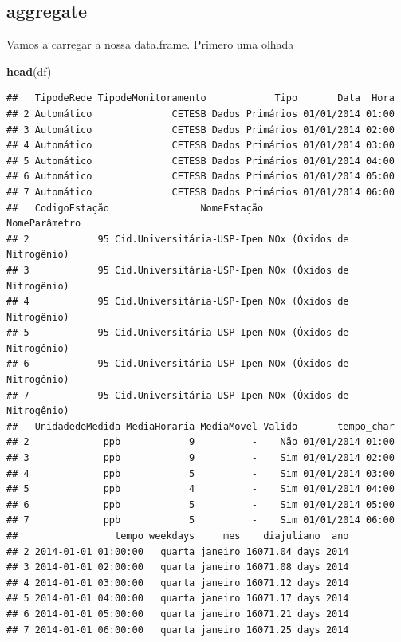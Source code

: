 \documentclass[]{book}
\newenvironment{Shaded}{\begin{snugshade}}{\end{snugshade}}
\newcommand{\KeywordTok}[1]{\textcolor[rgb]{0.13,0.29,0.53}{\textbf{#1}}}
\newcommand{\StringTok}[1]{\textcolor[rgb]{0.31,0.60,0.02}{#1}}
\newcommand{\OperatorTok}[1]{\textcolor[rgb]{0.81,0.36,0.00}{\textbf{#1}}}
\newcommand{\NormalTok}[1]{#1}
\theoremstyle{definition}
\theoremstyle{definition}
\theoremstyle{definition}
\theoremstyle{remark}
\begin{document}
\begin{Shaded}
\end{Shaded}

\subsection{aggregate}\label{aggregate}

Vamos a carregar a nossa data.frame. Primero uma olhada

\begin{Shaded}
\begin{Highlighting}[]
\KeywordTok{head}\NormalTok{(df)}
\end{Highlighting}
\end{Shaded}

\begin{verbatim}
##   TipodeRede TipodeMonitoramento            Tipo       Data  Hora
## 2 Automático              CETESB Dados Primários 01/01/2014 01:00
## 3 Automático              CETESB Dados Primários 01/01/2014 02:00
## 4 Automático              CETESB Dados Primários 01/01/2014 03:00
## 5 Automático              CETESB Dados Primários 01/01/2014 04:00
## 6 Automático              CETESB Dados Primários 01/01/2014 05:00
## 7 Automático              CETESB Dados Primários 01/01/2014 06:00
##   CodigoEstação                NomeEstação              NomeParâmetro
## 2            95 Cid.Universitária-USP-Ipen NOx (Óxidos de Nitrogênio)
## 3            95 Cid.Universitária-USP-Ipen NOx (Óxidos de Nitrogênio)
## 4            95 Cid.Universitária-USP-Ipen NOx (Óxidos de Nitrogênio)
## 5            95 Cid.Universitária-USP-Ipen NOx (Óxidos de Nitrogênio)
## 6            95 Cid.Universitária-USP-Ipen NOx (Óxidos de Nitrogênio)
## 7            95 Cid.Universitária-USP-Ipen NOx (Óxidos de Nitrogênio)
##   UnidadedeMedida MediaHoraria MediaMovel Valido       tempo_char
## 2             ppb            9          -    Não 01/01/2014 01:00
## 3             ppb            9          -    Sim 01/01/2014 02:00
## 4             ppb            5          -    Sim 01/01/2014 03:00
## 5             ppb            4          -    Sim 01/01/2014 04:00
## 6             ppb            5          -    Sim 01/01/2014 05:00
## 7             ppb            5          -    Sim 01/01/2014 06:00
##                 tempo weekdays     mes    diajuliano  ano
## 2 2014-01-01 01:00:00   quarta janeiro 16071.04 days 2014
## 3 2014-01-01 02:00:00   quarta janeiro 16071.08 days 2014
## 4 2014-01-01 03:00:00   quarta janeiro 16071.12 days 2014
## 5 2014-01-01 04:00:00   quarta janeiro 16071.17 days 2014
## 6 2014-01-01 05:00:00   quarta janeiro 16071.21 days 2014
## 7 2014-01-01 06:00:00   quarta janeiro 16071.25 days 2014
\end{verbatim}
\end{document}
